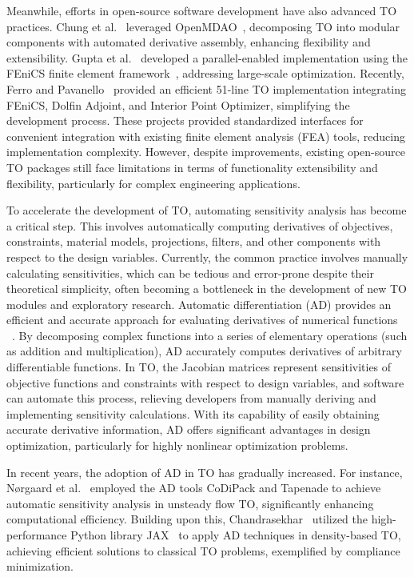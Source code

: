 \documentclass[mathpazo]{cicp}
\begin{document}
Meanwhile, efforts in open-source software development have also advanced TO practices. Chung et al.~\cite{chung2019topology} leveraged OpenMDAO~\cite{gray2019openmdao}, decomposing TO into modular components with automated derivative assembly, enhancing flexibility and extensibility. Gupta et al.~\cite{gupta202055} developed a parallel-enabled implementation using the FEniCS finite element framework~\cite{alnaes2015fenics}, addressing large-scale optimization. Recently, Ferro and Pavanello~\cite{ferro2023simple} provided an efficient 51-line TO implementation integrating FEniCS, Dolfin Adjoint, and Interior Point Optimizer, simplifying the development process. These projects provided standardized interfaces for convenient integration with existing finite element analysis (FEA) tools, reducing implementation complexity. However, despite improvements, existing open-source TO packages still face limitations in terms of functionality extensibility and flexibility, particularly for complex engineering applications.

To accelerate the development of TO, automating sensitivity analysis has become a critical step. This involves automatically computing derivatives of objectives, constraints, material models, projections, filters, and other components with respect to the design variables. Currently, the common practice involves manually calculating sensitivities, which can be tedious and error-prone despite their theoretical simplicity, often becoming a bottleneck in the development of new TO modules and exploratory research. Automatic differentiation (AD) provides an efficient and accurate approach for evaluating derivatives of numerical functions ~\cite{griewank2008evaluating}. By decomposing complex functions into a series of elementary operations (such as addition and multiplication), AD accurately computes derivatives of arbitrary differentiable functions. In TO, the Jacobian matrices represent sensitivities of objective functions and constraints with respect to design variables, and software can automate this process, relieving developers from manually deriving and implementing sensitivity calculations. With its capability of easily obtaining accurate derivative information, AD offers significant advantages in design optimization, particularly for highly nonlinear optimization problems.

In recent years, the adoption of AD in TO has gradually increased. For instance, Nørgaard et al.~\cite{norgaard2017applications} employed the AD tools CoDiPack and Tapenade to achieve automatic sensitivity analysis in unsteady flow TO, significantly enhancing computational efficiency. Building upon this, Chandrasekhar~\cite{chandrasekhar2021auto} utilized the high-performance Python library JAX~\cite{bradbury2018jax} to apply AD techniques in density-based TO, achieving efficient solutions to classical TO problems, exemplified by compliance minimization.
\end{document}
